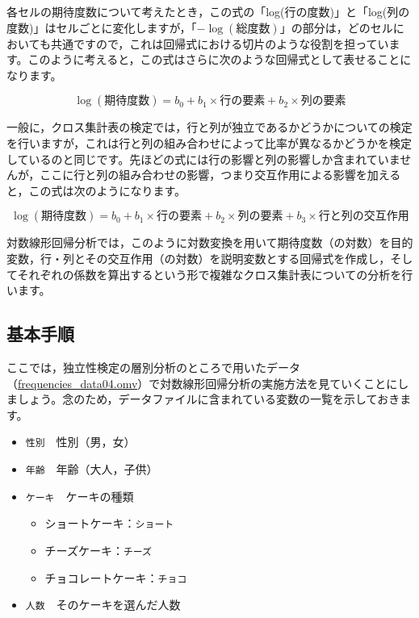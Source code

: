 \documentclass[
  12pt,
  a5jpaper,
  lualatex, ja=standard]{bxjsbook}
\providecommand{\tightlist}{%
  \setlength{\itemsep}{0pt}\setlength{\parskip}{0pt}}
\newenvironment{jmvvar}{%
	\begin{center}%
	\begin{tcolorbox}[%
		title=変数一覧,
		colframe=daidai,
		colbacktitle=daidai!30!white,
		coltitle=daidai!10!black,
		colback=daidai!2!white,
		breakable,
		width=.9\textwidth
		]\small\addtolength{\leftmargini}{-3\labelsep}%
	}%
	{\end{tcolorbox}\end{center}}
\begin{document}
各セルの期待度数について考えたとき，この式の「log(行の度数)」と「log(列の度数)」はセルごとに変化しますが，「\(-\log(\textsf{総度数})\)」の部分は，どのセルにおいても共通ですので，これは回帰式における切片のような役割を担っています。このように考えると，この式はさらに次のような回帰式として表せることになります。

\[
\log(\text{期待度数}) = b_0 + b_1\times \text{行の要素} + b_2\times \text{列の要素}
\]

一般に，クロス集計表の検定では，行と列が独立であるかどうかについての検定を行いますが，これは行と列の組み合わせによって比率が異なるかどうかを検定しているのと同じです。先ほどの式には行の影響と列の影響しか含まれていませんが，ここに行と列の組み合わせの影響，つまり交互作用による影響を加えると，この式は次のようになります。

\[
\log(\text{期待度数}) = b_0 + b_1\times \text{行の要素} + b_2\times \text{列の要素} + b_3\times\text{行と列の交互作用}
\]

対数線形回帰分析では，このように対数変換を用いて期待度数（の対数）を目的変数，行・列とその交互作用（の対数）を説明変数とする回帰式を作成し，そしてそれぞれの係数を算出するという形で複雑なクロス集計表についての分析を行います。

\hypertarget{sub:frequencies-loglin-procedure}{%
\subsection{基本手順}\label{sub:frequencies-loglin-procedure}}

ここでは，独立性検定の層別分析のところで用いたデータ（\href{https://github.com/sbtseiji/jmv_compguide/raw/main/data/omv/frequencies_data04.omv}{frequencies\_data04.omv}）で対数線形回帰分析の実施方法を見ていくことにしましょう。念のため，データファイルに含まれている変数の一覧を示しておきます。

\begin{jmvvar}

\begin{itemize}
\tightlist
\item
  \texttt{性別}　性別（男，女）
\item
  \texttt{年齢}　年齢（大人，子供）
\item
  \texttt{ケーキ}　ケーキの種類

  \begin{itemize}
  \tightlist
  \item
    ショートケーキ：\texttt{ショート}
  \item
    チーズケーキ：\texttt{チーズ}
  \item
    チョコレートケーキ：\texttt{チョコ}
  \end{itemize}
\item
  \texttt{人数}　そのケーキを選んだ人数
\end{itemize}

\end{jmvvar}
\end{document}
